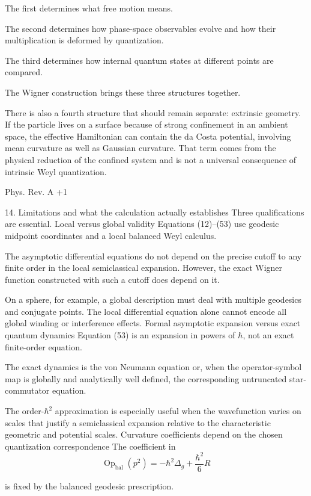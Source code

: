 The first determines what free motion means.

The second determines how phase-space observables evolve and how their multiplication is deformed by quantization.

The third determines how internal quantum states at different points are compared.

The Wigner construction brings these three structures together.

There is also a fourth structure that should remain separate: extrinsic geometry. If the particle lives on a surface because of strong confinement in an ambient space, the effective Hamiltonian can contain the da Costa potential, involving mean curvature as well as Gaussian curvature. That term comes from the physical reduction of the confined system and is not a universal consequence of intrinsic Weyl quantization. 

Phys. Rev. A
+1




14. Limitations and what the calculation actually establishes
Three qualifications are essential.
Local versus global validity
Equations (12)–(53) use geodesic midpoint coordinates and a local balanced Weyl calculus.

The asymptotic differential equations do not depend on the precise cutoff to any finite order in the local semiclassical expansion. However, the exact Wigner function constructed with such a cutoff does depend on it.

On a sphere, for example, a global description must deal with multiple geodesics and conjugate points. The local differential equation alone cannot encode all global winding or interference effects.
Formal asymptotic expansion versus exact quantum dynamics
Equation (53) is an expansion in powers of \(\hbar\), not an exact finite-order equation.

The exact dynamics is the von Neumann equation or, when the operator-symbol map is globally and analytically well defined, the corresponding untruncated star-commutator equation.

The order-\(\hbar^2\) approximation is especially useful when the wavefunction varies on scales that justify a semiclassical expansion relative to the characteristic geometric and potential scales.
Curvature coefficients depend on the chosen quantization correspondence
The coefficient in
\[
\operatorname{Op}_{\mathrm{bal}}(p^2)
=
-\hbar^2\Delta_g+\frac{\hbar^2}{6}R
\]

is fixed by the balanced geodesic prescription.

